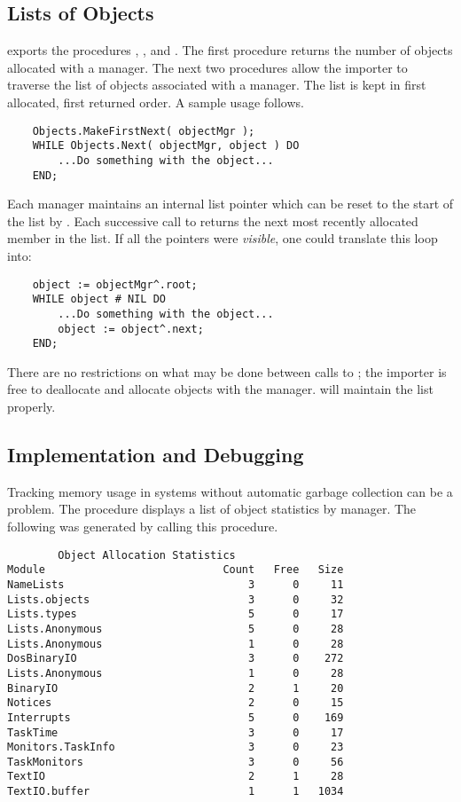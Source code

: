 \subsection{Lists of Objects}

 exports the procedures
, , and .
The first procedure returns the number of objects allocated with
a manager.  The next two procedures allow the
importer to traverse the list of objects associated with a manager.
The list is kept in first allocated, first returned order.  A
sample usage follows.

\begin{verbatim}
    Objects.MakeFirstNext( objectMgr );
    WHILE Objects.Next( objectMgr, object ) DO
        ...Do something with the object...
    END;
\end{verbatim}

Each manager maintains an internal list pointer which can be reset to the
start of the list by .  Each successive call to 
 returns the next most recently allocated member in the list.
If all the pointers were {\em visible}, one could translate this
loop into:

\begin{verbatim}
    object := objectMgr^.root;
    WHILE object # NIL DO
        ...Do something with the object...
        object := object^.next;
    END;
\end{verbatim}

There are no restrictions on what may be done between calls to 
; the importer is free to deallocate and allocate
objects with the manager.   will maintain the
list properly.

\subsection{Implementation and Debugging}

Tracking memory usage in systems without automatic
garbage collection can be a problem.  The procedure 
displays a list of object statistics by manager.  The
following was generated by calling this procedure.

\begin{verbatim}
        Object Allocation Statistics
Module                            Count   Free   Size
NameLists                             3      0     11
Lists.objects                         3      0     32
Lists.types                           5      0     17
Lists.Anonymous                       5      0     28
Lists.Anonymous                       1      0     28
DosBinaryIO                           3      0    272
Lists.Anonymous                       1      0     28
BinaryIO                              2      1     20
Notices                               2      0     15
Interrupts                            5      0    169
TaskTime                              3      0     17
Monitors.TaskInfo                     3      0     23
TaskMonitors                          3      0     56
TextIO                                2      1     28
TextIO.buffer                         1      1   1034
\end{verbatim}

